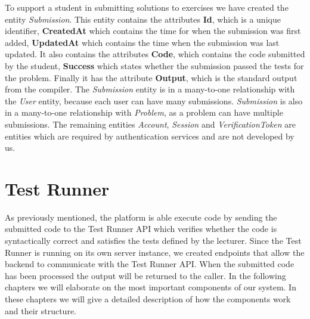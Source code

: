 To support a student in submitting solutions to exercises we have created the entity \textit{Submission}. This entity contains the attributes \textbf{Id}, which is a unique identifier, \textbf{CreatedAt} which contains the time for when the submission was first added, \textbf{UpdatedAt} which contains the time when the submission was last updated. It also contains the attributes \textbf{Code}, which contains the code submitted by the student, \textbf{Success} which states whether the submission passed the tests for the problem. Finally it has the attribute \textbf{Output}, which is the standard output from the compiler.
The \textit{Submission} entity is in a many-to-one relationship with the \textit{User} entity, because each user can have many submissions. \textit{Submission} is also in a many-to-one relationship with \textit{Problem}, as a problem can have multiple submissions.
The remaining entities \textit{Account}, \textit{Session} and \textit{VerificationToken} are entities which are required by authentication services and are not developed by us.

\section{Test Runner}
As previously mentioned, the platform is able execute code by sending the submitted code to the Test Runner API which verifies whether the code is syntactically correct and satisfies the tests defined by the lecturer.
Since the Test Runner is running on its own server instance, we created endpoints that allow the backend to communicate with the Test Runner API. When the submitted code has been processed the output will be returned to the caller.
In the following chapters we will elaborate on the most important components of our system. In these chapters we will give a detailed description of how the components work and their structure.